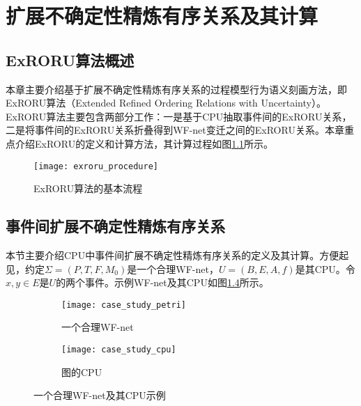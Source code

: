 \chapter{扩展不确定性精炼有序关系及其计算}\label{cha:exroru}
\section{ExRORU算法概述}\label{sec:exroru_intro}
本章主要介绍基于扩展不确定性精炼有序关系的过程模型行为语义刻画方法，即ExRORU算法（Extended Refined Ordering Relations with Uncertainty）。ExRORU算法主要包含两部分工作：一是基于CPU抽取事件间的ExRORU关系，二是将事件间的ExRORU关系折叠得到WF-net变迁之间的ExRORU关系。本章重点介绍ExRORU的定义和计算方法，其计算过程如图\ref{fig:exroru_procedure}所示。

\begin{figure}[htbp]
  \centering
  \texttt{[image: exroru\_procedure]}
  \caption{ExRORU算法的基本流程\label{fig:exroru_procedure}}
\end{figure}


\section{事件间扩展不确定性精炼有序关系}\label{sec:exroru_event}
本节主要介绍CPU中事件间扩展不确定性精炼有序关系的定义及其计算。方便起见，约定$\Sigma=(P,T,F,M_{0})$是一个合理WF-net，$U=(B,E,A,f)$是其CPU。令$x,y\in E$是$U$的两个事件。示例WF-net及其CPU如图\ref{fig:case_study}所示。

\begin{figure}[htbp]
  \centering
  \begin{subfigure}{1\textwidth}
  	\centering
  	\texttt{[image: case\_study\_petri]}
  	\caption{一个合理WF-net}
  	\label{fig:case_study_petri}
  \end{subfigure}
  \begin{subfigure}{1\textwidth}
  	\vspace{1em}
  	\centering
  	\texttt{[image: case\_study\_cpu]}
  	\caption{图的CPU}
  	\label{fig:case_study_cpu}
  \end{subfigure}
  \caption{一个合理WF-net及其CPU示例}
  \label{fig:case_study}
\end{figure}


